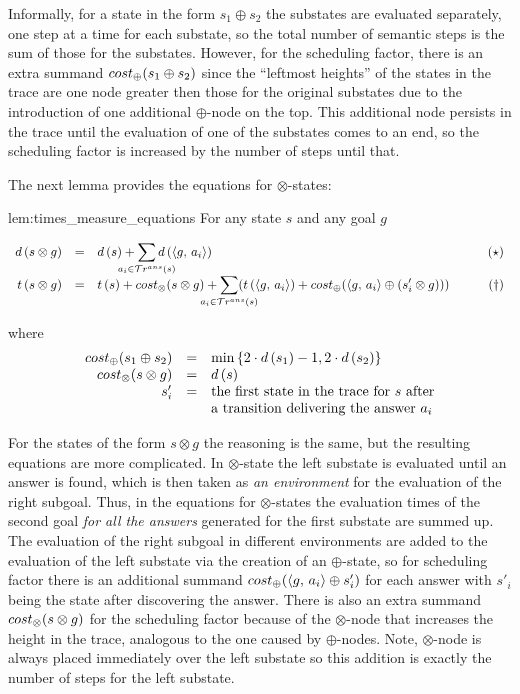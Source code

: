 Informally, for a state in the form $s_1 \oplus s_2$ the substates are evaluated separately, one step at a time for
each substate, so the total number of semantic steps is the sum of those for the substates. However, for the scheduling factor, 
there is an extra summand $cost_{\oplus}(s_1 \oplus s_2)$ since the ``leftmost heights'' of the states in the trace are one node greater then those for the
original substates due to the introduction of one additional $\oplus$-node on the top. This additional node persists in the trace until the evaluation
of one of the substates comes to an end, so the scheduling factor is increased by the number of steps until that.

The next lemma provides the equations for $\otimes$-states:

\begin{replemma}{lem:times_measure_equations}
  For any state $s$ and any goal $g$
  
\[
\begin{array}{rclr}
d\,(s \otimes g)  &=&  d\,(s) + \smashoperator[lr]{\sum\limits_{a_i \in \tra{s}}} d\,(\taskst{g}{a_i})& \qquad(\star) \\

 t\,(s \otimes g)  &=&  t\,(s) + \costconj{s}{g} + \smashoperator[lr]{\sum\limits_{a_i \in \tra{s}}} (t\,(\taskst{g}{a_i}) + \costdisj{\taskst{g}{a_i}}{(s'_i \otimes g)})&\qquad(\dagger)
\end{array}
\]

where 
\[
\begin{array}{rcl}
cost_{\oplus}(s_1 \oplus s_2) & = & \min\,\{2\cdot d\,(s_1) - 1, 2\cdot d\,(s_2)\} \\
cost_{\otimes}(s \otimes g) & = & d\,(s) \\
s'_i & = & \mbox{the first state in the trace for $s$ after} \\
 & & \mbox{a transition delivering the answer $a_i$} \\
\end{array}
\]
\end{replemma}

For the states of the form $s \otimes g$ the reasoning is the same, but the resulting equations are more complicated.
In $\otimes$-state the left substate is evaluated until an answer is found, which is then taken as
\emph{an environment} for the evaluation of the right subgoal.
Thus, in the equations for $\otimes$-states the evaluation times of the second goal \emph{for all
the answers} generated for the first substate are summed up. The evaluation of the right subgoal
in different environments are added to the evaluation of the left substate via the creation of
an $\oplus$-state, so for scheduling factor there is
an additional summand $cost_{\oplus}(\langle g ,\, a_i \rangle \oplus s'_i)$ for each answer with $s'_i$ being the state
after discovering the answer.
There is also an extra summand $cost_{\otimes}(s \otimes g)$ for the scheduling factor because of the
$\otimes$-node that increases the height in the trace, analogous to the one caused by
$\oplus$-nodes.
Note, $\otimes$-node is always placed immediately over the left substate so this
addition is exactly the number of steps for the left substate.

